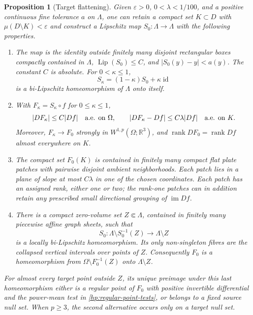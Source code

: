 \documentclass[11pt]{article}
\numberwithin{equation}{section}
\newtheorem{proposition}[theorem]{Proposition}
\theoremstyle{definition}
\theoremstyle{remark}
\newcommand{\R}{\mathbb R}
\newcommand{\eps}{\varepsilon}
\newcommand{\Id}{\operatorname{id}}
\DeclareMathOperator{\Lip}{Lip}
\DeclareMathOperator{\rank}{rank}
\begin{document}
\begin{proposition}[Target flattening]\label{hp:flattening}
Given $\eps>0$, $0<\lambda<1/100$, and a positive continuous fine
tolerance $a$ on $\Lambda$, one can retain a compact set $K\subset D$
with $\mu(D\setminus K)<\eps$ and construct a Lipschitz map
$S_0:\Lambda\to\Lambda$ with the following properties.
\begin{enumerate}
\item The map is the identity outside finitely many disjoint
rectangular boxes compactly contained in $\Lambda$,
$\Lip(S_0)\le C$, and $|S_0(y)-y|<a(y)$.  The constant $C$ is
absolute.  For $0<\kappa\le1$,
\[
 S_\kappa=(1-\kappa)S_0+\kappa\Id
\]
is a bi-Lipschitz homeomorphism of $\Lambda$ onto itself.
\item With $F_\kappa=S_\kappa\circ f$ for $0\le\kappa\le1$,
\begin{equation}\label{hp:flattening-derivative}
 |DF_\kappa|\le C|Df|\quad\hbox{a.e. on }\Omega,
 \qquad
 |DF_\kappa-Df|\le C\lambda|Df|
                   \quad\hbox{a.e. on }K.
\end{equation}
Moreover, $F_\kappa\to F_0$ strongly in $W^{1,p}(\Omega;\R^3)$,
and $\rank DF_0=\rank Df$ almost everywhere on $K$.
\item The compact set $F_0(K)$ is contained in finitely many compact
flat plate patches with pairwise disjoint ambient neighborhoods.
Each patch lies in a plane of slope at most $C\lambda$ in one of
the chosen coordinates.  Each patch has an assigned rank, either
one or two; the rank-one patches can in addition retain any prescribed
small directional grouping of $\operatorname{im}Df$.
\item There is a compact zero-volume set $Z\Subset\Lambda$,
contained in finitely many piecewise affine graph sheets, such that
\begin{equation}\label{hp:flattening-homeomorphic-complement}
 S_0:\Lambda\setminus S_0^{-1}(Z)\longrightarrow\Lambda\setminus Z
\end{equation}
is a locally bi-Lipschitz homeomorphism.  Its only non-singleton
fibres are the collapsed vertical intervals over points of $Z$.
Consequently $F_0$ is a homeomorphism from
$\Omega\setminus F_0^{-1}(Z)$ onto $\Lambda\setminus Z$.
\end{enumerate}
For almost every target point outside $Z$, its unique preimage under
this last homeomorphism either is a regular point of $F_0$ with
positive invertible differential and the power-mean test in
\eqref{hp:regular-point-tests}, or belongs to a fixed source null set.
When $p\ge3$, the second alternative occurs only on a target null
set.
\end{proposition}
\end{document}
